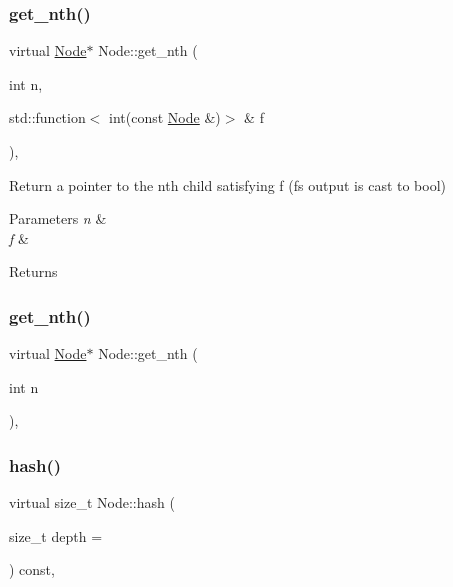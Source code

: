 \subsubsection{\texorpdfstring{get\+\_\+nth()}{get\_nth()}\hspace{0.1cm}{\footnotesize\ttfamily [1/2]}}
{\footnotesize\ttfamily virtual \hyperlink{class_node}{Node}$\ast$ Node\+::get\+\_\+nth (\begin{DoxyParamCaption}\item[{int}]{n,  }\item[{std\+::function$<$ int(const \hyperlink{class_node}{Node} \&)$>$ \&}]{f }\end{DoxyParamCaption})\hspace{0.3cm}{\ttfamily [inline]}, {\ttfamily [virtual]}}

Return a pointer to the n\textquotesingle{}th child satisfying f (f\textquotesingle{}s output is cast to bool) 
\begin{DoxyParams}{Parameters}
{\em n} & \\
\hline
{\em f} & \\
\hline
\end{DoxyParams}
\begin{DoxyReturn}{Returns}

\end{DoxyReturn}
\mbox{\label{class_node_a224c0ee6dae35ddce70f8fd3b91e0b1c}} 
\subsubsection{\texorpdfstring{get\+\_\+nth()}{get\_nth()}\hspace{0.1cm}{\footnotesize\ttfamily [2/2]}}
{\footnotesize\ttfamily virtual \hyperlink{class_node}{Node}$\ast$ Node\+::get\+\_\+nth (\begin{DoxyParamCaption}\item[{int}]{n }\end{DoxyParamCaption})\hspace{0.3cm}{\ttfamily [inline]}, {\ttfamily [virtual]}}

\mbox{\label{class_node_a212f2e1ba4ff71de6954b0b791d89979}} 
\subsubsection{\texorpdfstring{hash()}{hash()}}
{\footnotesize\ttfamily virtual size\+\_\+t Node\+::hash (\begin{DoxyParamCaption}\item[{size\+\_\+t}]{depth = {} }\end{DoxyParamCaption}) const\hspace{0.3cm}{\ttfamily [inline]}, {\ttfamily [virtual]}}

